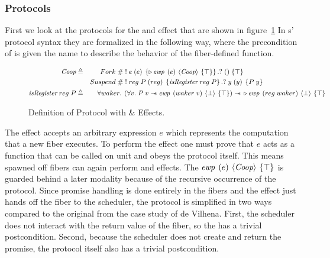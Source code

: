 \subsubsection{Protocols}
\label{sec:sched-spec-protocols}

First we look at the protocols for the \efork{} and \esuspend{} effect that are shown in figure~\ref{fig:coop-protocol-simpl}
In \hazel{}s' protocol syntax they are formalized in the following way, where the precondition of \esuspend{} is given the name \isreg{} to describe the behavior of the fiber-defined  function.

\begin{figure}[ht]
  \begin{alignat*}{2}
    \proto{}           & \triangleq & \quad Fork\; \#  & \; !\; e\; (e)\; \left\{\later \ewp{e}{\proto{}}{\top}\right\}. ?\; ()\; \{ \top \}                                 \\
                       &            & Suspend\;    \#  & \; !\; reg\; P\; (reg)\; \left\{\isreg{}\; reg\; P\right\}.?\; y\; (y)\; \left\{ P\; y \right\}                     \\
    \isreg{}\; reg\; P & \triangleq & \forall waker.\; & \left( \forall v.\;  P\; v \wand{} \ewp{waker\; v}{\bot}{\top} \right) \wand{} \later \ewp{reg\; waker}{\bot}{\top}
  \end{alignat*}
  \caption{Definition of \proto{} Protocol with \efork{} \& \esuspend{} Effects.}
  \label{fig:coop-protocol-simpl}
\end{figure}

The \efork{} effect accepts an arbitrary expression \(e\) which represents the computation that a new fiber executes.
To perform the effect one must prove that \(e\) acts as a function that can be called on unit and obeys the \proto{} protocol itself.
This means spawned off fibers can again perform \efork{} and \esuspend{} effects.
The \(\ewp{e}{\proto{}}{\top}\) is guarded behind a later modality because of the recursive occurrence of the \proto{} protocol.
Since promise handling is done entirely in the fibers and the \efork{} effect just hands off the fiber to the scheduler, the protocol is simplified in two ways compared to the original from the case study of de Vilhena.
First, the scheduler does not interact with the return value of the fiber, so the \ewpt{} has a trivial postcondition.
Second, because the scheduler does not create and return the promise, the protocol itself also has a trivial postcondition.


